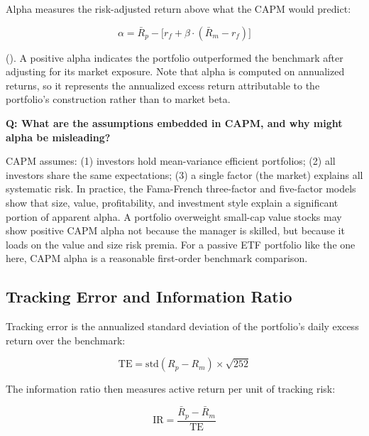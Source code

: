 Alpha measures the risk-adjusted return above what the CAPM would predict:

\begin{equation}
  \alpha = \bar{R}_p - \bigl[r_f + \beta \cdot (\bar{R}_m - r_f)\bigr]
  \label{eq:alpha}
\end{equation}

(). A positive alpha indicates the portfolio outperformed the benchmark after adjusting for its market exposure. Note that alpha is computed on annualized returns, so it represents the annualized excess return attributable to the portfolio's construction rather than to market beta.

\begin{interviewbox}
  \textbf{Q: What are the assumptions embedded in CAPM, and why might alpha be misleading?}

  CAPM assumes: (1) investors hold mean-variance efficient portfolios; (2) all investors share the same expectations; (3) a single factor (the market) explains all systematic risk. In practice, the Fama-French three-factor and five-factor models show that size, value, profitability, and investment style explain a significant portion of apparent alpha. A portfolio overweight small-cap value stocks may show positive CAPM alpha not because the manager is skilled, but because it loads on the value and size risk premia. For a passive ETF portfolio like the one here, CAPM alpha is a reasonable first-order benchmark comparison.
\end{interviewbox}

\subsection{Tracking Error and Information Ratio}

Tracking error is the annualized standard deviation of the portfolio's daily excess return over the benchmark:

\begin{equation}
  \text{TE} = \text{std}(R_p - R_m) \times \sqrt{252}
  \label{eq:te}
\end{equation}

The information ratio then measures active return per unit of tracking risk:

\begin{equation}
  \text{IR} = \frac{\bar{R}_p - \bar{R}_m}{\text{TE}}
  \label{eq:ir}
\end{equation}


